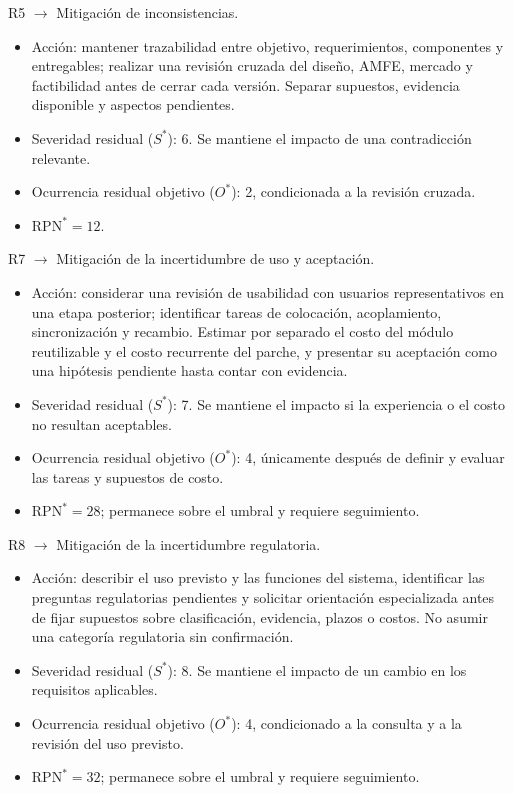 \noindent R5 $\rightarrow$ Mitigación de inconsistencias.
\begin{itemize}
    \item Acción: mantener trazabilidad entre objetivo, requerimientos, componentes y entregables; realizar una revisión cruzada del diseño, AMFE, mercado y factibilidad antes de cerrar cada versión. Separar supuestos, evidencia disponible y aspectos pendientes.
    \item Severidad residual ($S^{*}$): 6. Se mantiene el impacto de una contradicción relevante.
    \item Ocurrencia residual objetivo ($O^{*}$): 2, condicionada a la revisión cruzada.
    \item $\mathrm{RPN}^{*} = 12$.
\end{itemize}

\noindent R7 $\rightarrow$ Mitigación de la incertidumbre de uso y aceptación.
\begin{itemize}
    \item Acción: considerar una revisión de usabilidad con usuarios representativos en una etapa posterior; identificar tareas de colocación, acoplamiento, sincronización y recambio. Estimar por separado el costo del módulo reutilizable y el costo recurrente del parche, y presentar su aceptación como una hipótesis pendiente hasta contar con evidencia.
    \item Severidad residual ($S^{*}$): 7. Se mantiene el impacto si la experiencia o el costo no resultan aceptables.
    \item Ocurrencia residual objetivo ($O^{*}$): 4, únicamente después de definir y evaluar las tareas y supuestos de costo.
    \item $\mathrm{RPN}^{*} = 28$; permanece sobre el umbral y requiere seguimiento.
\end{itemize}

\noindent R8 $\rightarrow$ Mitigación de la incertidumbre regulatoria.
\begin{itemize}
    \item Acción: describir el uso previsto y las funciones del sistema, identificar las preguntas regulatorias pendientes y solicitar orientación especializada antes de fijar supuestos sobre clasificación, evidencia, plazos o costos. No asumir una categoría regulatoria sin confirmación.
    \item Severidad residual ($S^{*}$): 8. Se mantiene el impacto de un cambio en los requisitos aplicables.
    \item Ocurrencia residual objetivo ($O^{*}$): 4, condicionado a la consulta y a la revisión del uso previsto.
    \item $\mathrm{RPN}^{*} = 32$; permanece sobre el umbral y requiere seguimiento.
\end{itemize}


